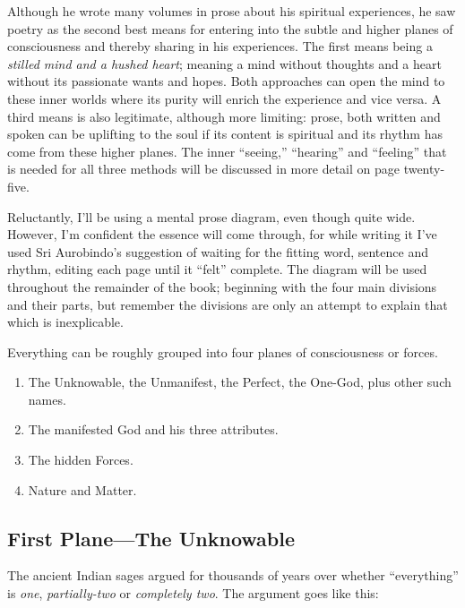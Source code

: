 \documentclass[12pt,a4paper]{book}
\begin{document}
Although he wrote many volumes in prose about his spiritual
experiences, he saw poetry as the second best means for entering into
the subtle and higher planes of consciousness and thereby sharing in
his experiences. The first means being a \emph{stilled mind and a
  hushed heart}; meaning a mind without thoughts and a heart without
its passionate wants and hopes. Both approaches can open the mind to
these inner worlds where its purity will enrich the experience and
vice versa. A third means is also legitimate, although more limiting:
prose, both written and spoken can be uplifting to the soul if its
content is spiritual and its rhythm has come from these higher planes.
The inner ``seeing,'' ``hearing'' and ``feeling'' that is needed for
all three methods will be discussed in more detail on page
twenty-five.

Reluctantly, I'll be using a mental prose diagram, even though quite
wide. However, I'm confident the essence will come through, for while
writing it I've used Sri Aurobindo's suggestion of waiting for the
fitting word, sentence and rhythm, editing each page until it ``felt''
complete.  The diagram will be used throughout the remainder of the
book; beginning with the four main divisions and their parts, but
remember the divisions are only an attempt to explain that which is
inexplicable.

Everything can be roughly grouped into four planes of consciousness or forces.


\begin{enumerate}
\item The Unknowable, the Unmanifest, the Perfect, the One-God, plus other such names.

\item The manifested God and his three attributes.

\item The hidden Forces.

\item Nature and Matter.
\end{enumerate}


\newpage
\begin{center}\section*{First Plane---The Unknowable}\end{center}

The ancient Indian sages argued for thousands of years over whether
``everything'' is \emph{one}, \emph{partially-two} or \emph{completely
  two}. The argument goes like this:
\end{document}
